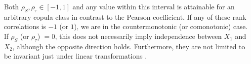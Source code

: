 Both $\rho_S, \rho_{\tau} \in [-1,1]$ and any value within this interval is attainable for an arbitrary copula class in contrast to the Pearson coefficient. 
If any of these rank correlations is $-1$ (or $1$), we are in the countermonotonic (or comonotonic) case. If $\rho_S$ (or $\rho_{\tau}$) $=0$, this does not necessarily imply independence between $X_1$ and $X_2$, although the opposite direction holds.
Furthermore, they are not limited to be invariant just under linear transformations . 










